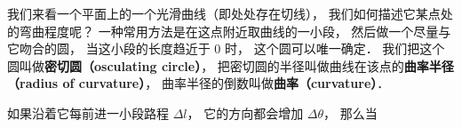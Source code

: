 

我们来看一个平面上的一个光滑曲线（即处处存在切线）， 我们如何描述它某点处的弯曲程度呢？ 一种常用方法是在这点附近取曲线的一小段， 然后做一个尽量与它吻合的圆， 当这小段的长度趋近于 0 时， 这个圆可以唯一确定． 我们把这个圆叫做\textbf{密切圆（osculating circle）}， 把密切圆的半径叫做曲线在该点的\textbf{曲率半径（radius of curvature）}， 曲率半径的倒数叫做\textbf{曲率（curvature）}．


如果沿着它每前进一小段路程 $\Delta l$， 它的方向都会增加 $\Delta \theta$， 那么当
